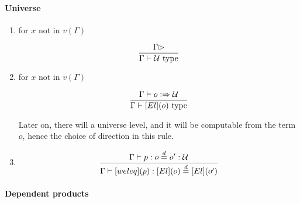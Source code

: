 \documentclass[11pt]{article}
\newcommand{\eqd}{\stackrel{d}{=}}
\newcommand{\Eu}{{\cal U}}
\newcommand{\synth}{\vcentcolon\Rightarrow}
\newcommand{\Type}{\mathop{{\, \rm type}}}
\begin{document}
\paragraph{Universe}

\begin{enumerate}

\item for $x$ not in $v(\Gamma)$

$$\frac{\Gamma\rhd}{\Gamma \vdash \Eu\Type}$$

\item for $x$ not in $v(\Gamma)$

$$\frac{\Gamma\vdash o \synth \Eu}{\Gamma \vdash [El](o)\Type}$$

Later on, there will a universe level, and it will be computable from the
term $o$, hence the choice of direction in this rule.

\item 

$$\frac{\Gamma\vdash p : o \eqd o' : \Eu}{\Gamma\vdash [weleq](p) : [El](o) \eqd [El](o')}$$

\end{enumerate}

\paragraph{Dependent products}
\end{document}
